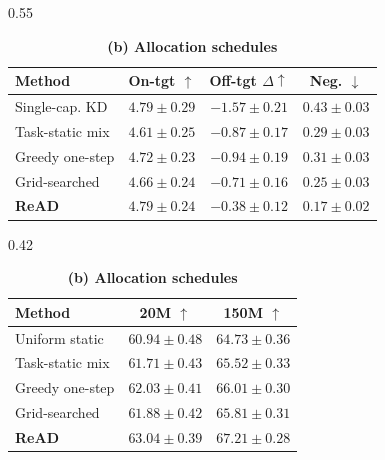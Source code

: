 

\begin{table}[h]
  \centering
  \captionsetup{font=small, width=0.96\linewidth, skip=3pt}
  \caption{}
  \label{tab:budget_diagnostics}

  \footnotesize
  \setlength{\tabcolsep}{2.2pt}
  \renewcommand{\arraystretch}{0.94}

  \begin{subtable}[t]{0.55\linewidth}
    \centering
    \caption*{\textbf{(a) Harmful transfer at 150M}}
    \begin{tabular}{@{}lccc@{}}
      \toprule
      \textbf{Method} & \textbf{On-tgt $\uparrow$} & \textbf{Off-tgt $\Delta\uparrow$} & \textbf{Neg. $\downarrow$} \\
      \midrule
      Single-cap. KD
        & $\mathbf{4.79{\pm}0.29}$
        & $-1.57{\pm}0.21$
        & $0.43{\pm}0.03$ \\
      Task-static mix
        & $4.61{\pm}0.25$
        & $-0.87{\pm}0.17$
        & $0.29{\pm}0.03$ \\
      Greedy one-step
        & $4.72{\pm}0.23$
        & $-0.94{\pm}0.19$
        & $0.31{\pm}0.03$
        \\
      Grid-searched
        & $4.66{\pm}0.24$
        & $-0.71{\pm}0.16$
        & $0.25{\pm}0.03$
        \\
      \textbf{ReAD}
        & $4.79{\pm}0.24$
        & $\mathbf{-0.38{\pm}0.12}$
        & $\mathbf{0.17{\pm}0.02}$ \\
      \bottomrule
    \end{tabular}
  \end{subtable}
  \hfill
  \begin{subtable}[t]{0.42\linewidth}
    \centering
    \caption*{\textbf{(b) Allocation schedules}}
    \begin{tabular}{@{}lcc@{}}
      \toprule
      \textbf{Method} & \textbf{20M $\uparrow$} & \textbf{150M $\uparrow$} \\
      \midrule
      Uniform static
        & $60.94{\pm}0.48$
        & $64.73{\pm}0.36$ \\
      Task-static mix
        & $61.71{\pm}0.43$
        & $65.52{\pm}0.33$ \\
      Greedy one-step
        & $62.03{\pm}0.41$
        & $66.01{\pm}0.30$ \\
      Grid-searched
        & $61.88{\pm}0.42$
        & $65.81{\pm}0.31$ \\
      \textbf{ReAD}
        & $\mathbf{63.04{\pm}0.39}$
        & $\mathbf{67.21{\pm}0.28}$ \\
      \bottomrule
    \end{tabular}
  \end{subtable}

  \end{table}

